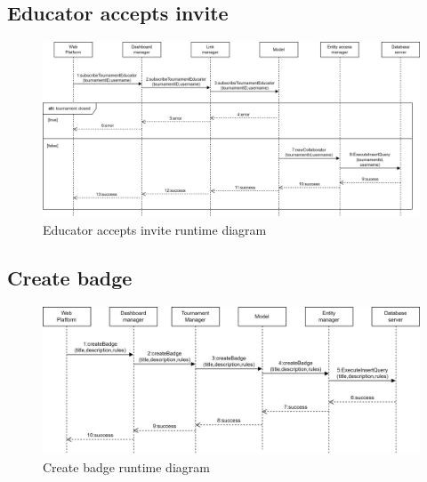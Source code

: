 \subsection*{Educator accepts invite}
\begin{figure}[h]
    \centering
    \includegraphics[width=\textwidth]{images/runtime/acceptE.png}
    \caption{Educator accepts invite runtime diagram}
    \label{fig:rt-acceptE}
\end{figure}
\clearpage

\subsection*{Create badge}
\begin{figure}[h]
    \centering
    \includegraphics[width=\textwidth]{images/runtime/createBadge.png}
    \caption{Create badge runtime diagram}
    \label{fig:rt-createBadge}
\end{figure}

